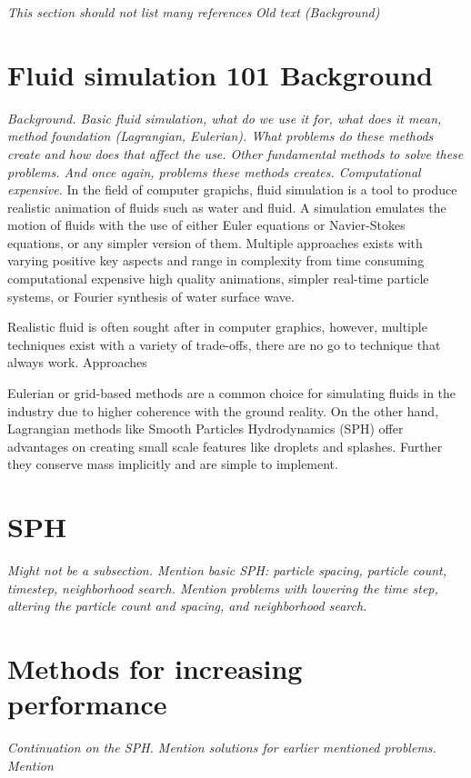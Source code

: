 \documentclass[../main.tex]{subfiles}
\begin{document}
\textit{This section should not list many references}
\textit{Old text (Background)}
\hspace{1pt}

\section{Fluid simulation 101 Background}
\textit{Background. Basic fluid simulation, what do we use it for, what does it mean, method foundation (Lagrangian, Eulerian). What problems do these methods create and how does that affect the use. Other fundamental methods to solve these problems. And once again, problems these methods creates. Computational expensive. }
In the field of computer grapichs, fluid simulation is a tool to produce realistic animation of fluids such as water and fluid. A simulation emulates the motion of fluids with the use of either Euler equations or Navier-Stokes equations, or any simpler version of them. Multiple approaches exists with varying positive key aspects and range in complexity from time consuming computational expensive high quality animations, simpler real-time particle systems, or Fourier synthesis of water surface wave. 

Realistic fluid is often sought after in computer graphics, however, multiple techniques exist with a variety of trade-offs, there are no go to technique that always work. Approaches   

Eulerian or grid-based methods are a common choice for simulating fluids in the industry due to higher coherence with the ground reality. On the other hand, Lagrangian methods like Smooth Particles Hydrodynamics (SPH) offer advantages on creating small scale features like droplets and splashes. Further they conserve mass implicitly and are simple to implement.


\section{SPH}
\textit{Might not be a subsection. Mention basic SPH: particle spacing, particle count, timestep, neighborhood search. Mention problems with lowering the time step, altering the particle count and spacing, and neighborhood search. }


\section{Methods for increasing performance}
\textit{Continuation on the SPH. Mention solutions for earlier mentioned problems. Mention }
\end{document}
